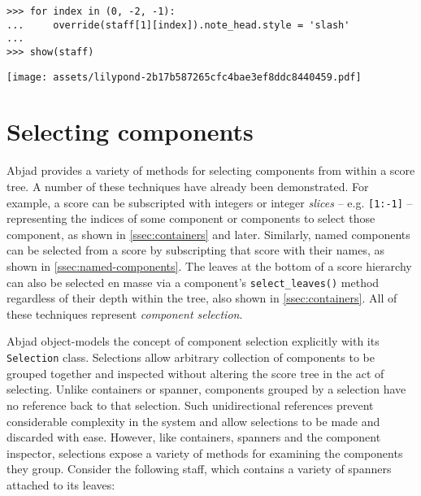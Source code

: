 \begin{comment}
<abjad>
for index in (0, -2, -1):
    override(staff[1][index]).note_head.style = 'slash'

show(staff)
</abjad>
\end{comment}

\begin{abjadbookoutput}
\begin{singlespacing}
\vspace{-0.5\baselineskip}
\begin{verbatim}
>>> for index in (0, -2, -1):
...     override(staff[1][index]).note_head.style = 'slash'
...
>>> show(staff)
\end{verbatim}
\noindent\texttt{[image: assets/lilypond-2b17b587265cfc4bae3ef8ddc8440459.pdf]}
\end{singlespacing}
\end{abjadbookoutput}


\section{Selecting components}
\label{sec:selecting-components}

Abjad provides a variety of methods for selecting components from within a
score tree. A number of these techniques have already been demonstrated. For
example, a score can be subscripted with integers or integer \emph{slices} --
e.g. \texttt{[1:-1]} -- representing the indices of some component or
components to select those component, as shown in \autoref{ssec:containers}
and later. Similarly, named components can be selected from a score by
subscripting that score with their names, as shown in
\autoref{ssec:named-components}. The leaves at the bottom of a score hierarchy
can also be selected en masse via a component's \texttt{select\_leaves()}
method regardless of their depth within the tree, also shown in
\autoref{ssec:containers}. All of these techniques represent \emph{component
selection}.

Abjad object-models the concept of component selection explicitly with its
\texttt{Selection} class. Selections allow arbitrary collection of components
to be grouped together and inspected without altering the score tree in the act
of selecting. Unlike containers or spanner, components grouped by a selection
have no reference back to that selection. Such unidirectional references
prevent considerable complexity in the system and allow selections to be made
and discarded with ease. However, like containers, spanners and the component
inspector, selections expose a variety of methods for examining the components
they group. Consider the following staff, which contains a variety of spanners
attached to its leaves:

